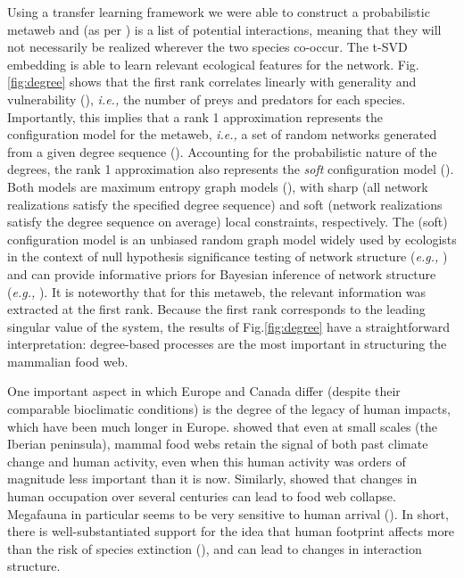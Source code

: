 \begin{refsection}
Using a transfer learning framework we were able to construct a
probabilistic metaweb and (as per \cite{Dunne2006Network}) is a list of
potential interactions, meaning that they will not necessarily be
realized wherever the two species co-occur. The t-SVD embedding is able
to learn relevant ecological features for the network. Fig.\ref{fig:degree} shows
that the first rank correlates linearly with generality and
vulnerability (\cite{Schoener1989Food}), \emph{i.e.,} the number of preys
and predators for each species. Importantly, this implies that a rank 1
approximation represents the configuration model for the metaweb,
\emph{i.e.,} a set of random networks generated from a given degree
sequence (\cite{Park2004Statistical}). Accounting for the probabilistic nature
of the degrees, the rank 1 approximation also represents the \emph{soft}
configuration model (\cite{vanderHoorn2018Sparse}). Both models are
maximum entropy graph models (\cite{Garlaschelli2018Covariance}), with sharp
(all network realizations satisfy the specified degree sequence) and
soft (network realizations satisfy the degree sequence on average) local
constraints, respectively. The (soft) configuration model is an unbiased
random graph model widely used by ecologists in the context of null
hypothesis significance testing of network structure (\emph{e.g.,}
\cite{Bascompte2003Nested}) and can provide informative priors for Bayesian
inference of network structure (\emph{e.g.,} \cite{Young2021Bayesian}). It is
noteworthy that for this metaweb, the relevant information was extracted
at the first rank. Because the first rank corresponds to the leading
singular value of the system, the results of Fig.\ref{fig:degree} have a
straightforward interpretation: degree-based processes are the most
important in structuring the mammalian food web.

One important aspect in which Europe and Canada differ (despite their
comparable bioclimatic conditions) is the degree of the legacy of human
impacts, which have been much longer in Europe. \cite{Nenzen2014Impact} showed
that even at small scales (the Iberian peninsula), mammal food webs
retain the signal of both past climate change and human activity, even
when this human activity was orders of magnitude less important than it
is now. Similarly, \cite{Yeakel2014Collapse} showed that changes in human
occupation over several centuries can lead to food web collapse.
Megafauna in particular seems to be very sensitive to human arrival
(\cite{Pires2015Pleistocene}). In short, there is well-substantiated support
for the idea that human footprint affects more than the risk of species
extinction (\cite{Marco2018Changes}), and can lead to changes in
interaction structure.


\end{refsection}
